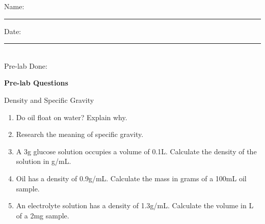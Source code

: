\documentclass[main.tex]{subfiles}
\begin{document}
\newpage
\setdoublesep{0.35700 em}  %
\setatomsep{1.78500 em}    %
\setbondoffset{0.18265 em} %
\newcommand{\bondwidth}{0.06642 em} %
\setbondstyle{line width = \bondwidth}



 
 

\begin{multicols}{2}
\begin{tcolorbox}[enhanced jigsaw,breakable,size=title,
colback=mybrown!05,colframe=black,fonttitle=\bfseries,
title=STUDENT INFO,pad at break=1mm, break at=15cm/0pt ]
\vspace{0.2cm}
\noindent Name: \rule{5cm}{0.4pt}Date:\rule{1cm}{0.4pt}\\
Pre-lab Done: \quad
\end{tcolorbox}
\end{multicols}
\hfill
\vspace{0.2cm}
\begin{center}
{\large \bfseries 
Pre-lab Questions 
\par
\Huge
Density and Specific Gravity
\\[5pt] \par}
\vspace{0.2cm}
\end{center}
\par
\noindent
\uline{  \hfill \normalsize \hfill       }

\begin{enumerate}
\item Do oil float on water? Explain why.
\vspace{3cm}

\item Research the meaning of specific gravity.
\vspace{3cm}

\item A 3g glucose solution occupies a volume of 0.1L. Calculate the density of the solution in g/mL.
\vspace{3cm}


\item Oil has a density of 0.9g/mL.  Calculate the mass in grams of a 100mL oil sample.
\vspace{3cm}


\item An electrolyte solution has a density of 1.3g/mL.  Calculate the volume in L of a 2mg  sample.
\vspace{3cm}



\end{enumerate}
\end{document}
